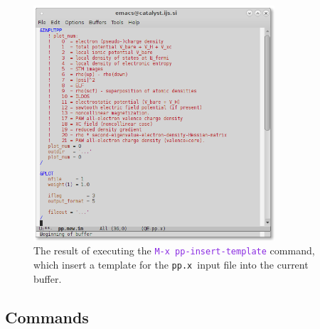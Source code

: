 \documentclass[12pt,a4paper]{article}
\def\ppx{\texttt{pp.x}}
\def\efn#1{\textcolor{BlueViolet}{\texttt{#1}}}
\begin{document}
\begin{figure}[htb]
  \centering
  \includegraphics[width=0.8\textwidth]{insert-template.png}
  \caption{The result of executing the \efn{M-x pp-insert-template}
    command, which insert a template for the \ppx\ input file into the
    current buffer.}
  \label{fig:insert-template}
\end{figure}
\subsection{Commands}
\end{document}
